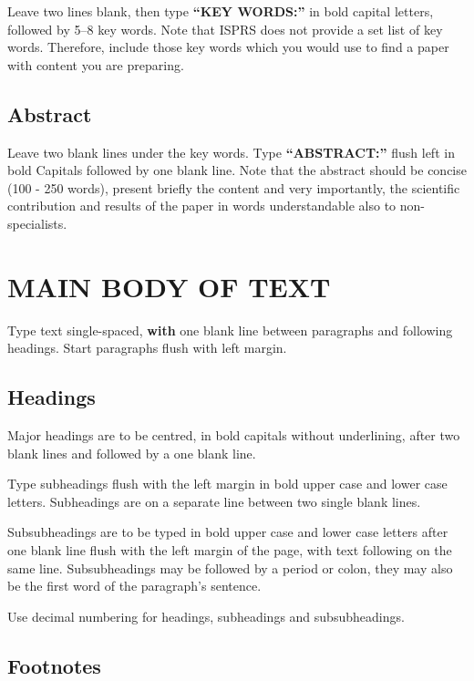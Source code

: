 \documentclass{isprs} %
\begin{document}
Leave two lines blank, then type \textbf{``KEY WORDS:''}
in bold capital letters, followed by 5--8 key words. Note that ISPRS does not provide a set
list of key words. Therefore, include those key words which you would
use to find a paper with content you are preparing.


\subsection{Abstract}\label{sec:Abstract}

Leave two blank lines under the key words. Type \textbf{``ABSTRACT:''}
flush left in bold Capitals followed by one blank line. Note that the abstract should be concise (100 - 250 words), present briefly the content and very importantly, the scientific contribution and results of the paper in words understandable also to non-specialists.


\section{MAIN BODY OF TEXT}\label{sec:MAIN BODY OF TEXT}

Type text single-spaced, \textbf{with} one blank line between paragraphs and
following headings. Start paragraphs flush with left margin.


\subsection{Headings}\label{sec:Headings}

Major headings are to be centred, in bold capitals without
underlining, after two blank lines and followed by a one blank line.

Type subheadings flush with the left margin in bold upper case and lower
case letters. Subheadings are on a separate line between two single blank lines.

Subsubheadings are to be typed in bold upper case and lower case letters
after one blank line flush with the left margin of the page, with text
following on the same line. Subsubheadings may be followed by a period
or colon, they may also be the first word of the paragraph's sentence.

Use decimal numbering for headings, subheadings and subsubheadings.


\subsection{Footnotes}\label{sec:Footnotes}
\end{document}
